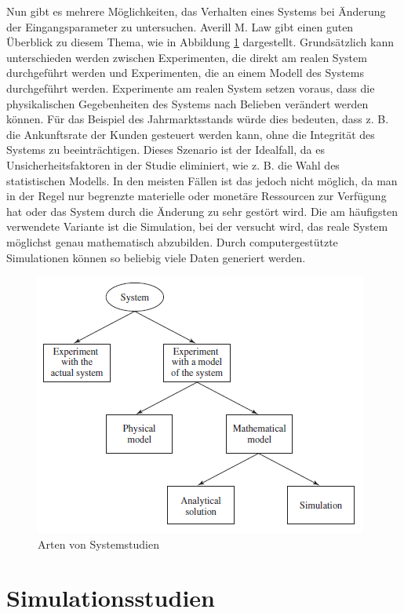 Nun gibt es mehrere Möglichkeiten, das Verhalten eines Systems bei Änderung der Eingangsparameter zu untersuchen.
Averill M. Law\cite{Law} gibt einen guten Überblick zu diesem Thema, wie in Abbildung \ref{fig:sysstudy} dargestellt.
Grundsätzlich kann unterschieden werden zwischen Experimenten, die direkt am realen System durchgeführt werden und Experimenten, die an einem Modell des Systems durchgeführt werden. 
Experimente am realen System setzen voraus, dass die physikalischen Gegebenheiten des Systems nach Belieben verändert werden können.
Für das Beispiel des Jahrmarktsstands würde dies bedeuten, dass z. B. die Ankunftsrate der Kunden gesteuert werden kann, ohne die Integrität des Systems zu beeinträchtigen.
Dieses Szenario ist der Idealfall, da es Unsicherheitsfaktoren in der Studie eliminiert, wie z. B. die Wahl des statistischen Modells.
In den meisten Fällen ist das jedoch nicht möglich, da man in der Regel nur begrenzte materielle oder monetäre Ressourcen zur Verfügung hat oder das System durch die Änderung zu sehr gestört wird.
Die am häufigsten verwendete Variante ist die Simulation, bei der versucht wird, das reale System möglichst genau mathematisch abzubilden. Durch computergestützte Simulationen können so beliebig viele Daten generiert werden.

\begin{figure}[h]
	\centering
	\includegraphics[]{bilder/system_study}
	\caption{Arten von Systemstudien}
  \label{fig:sysstudy}
\end{figure}

\section{Simulationsstudien}

